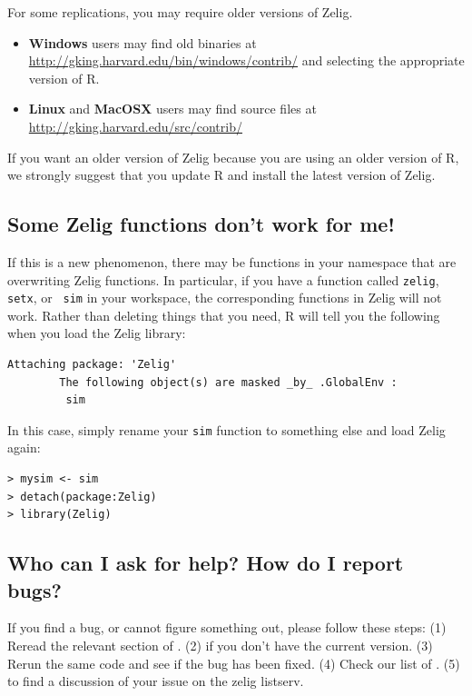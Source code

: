 For some replications, you may require older versions of Zelig. 
\begin{itemize}
\item {\bf Windows} users may find old binaries at
\url{http://gking.harvard.edu/bin/windows/contrib/}
and selecting the appropriate version of R.

\item {\bf Linux} and {\bf MacOSX} users may find source files at
\url{http://gking.harvard.edu/src/contrib/} 
\end{itemize}  
If you want an older version of Zelig because you are using an older
version of R, we strongly suggest that you update R and install the
latest version of Zelig.  

\subsection*{Some Zelig functions don't work for me!}

If this is a new phenomenon, there may be functions in your
namespace that are overwriting Zelig functions.  In particular, if you
have a function called {\tt zelig}, {\tt setx}, or {\tt
sim} in your workspace, the corresponding functions in Zelig will not
work.  Rather than deleting things that you need, R will tell you the
following when you load the Zelig library:
\begin{verbatim}
Attaching package: 'Zelig'
        The following object(s) are masked _by_ .GlobalEnv :
         sim 
\end{verbatim}
In this case, simply rename your {\tt sim} function to something else
and load Zelig again: 
\begin{verbatim}
> mysim <- sim
> detach(package:Zelig)     
> library(Zelig)
\end{verbatim}

\subsection*{Who can I ask for help?  How do I report bugs?}

If you find a bug, or cannot figure something out, please follow these
steps: (1) Reread the relevant section of .  (2)
 if you
don't have the current version.  (3) Rerun the same code and see if
the bug has been fixed.  (4) Check our list
of .
(5)  to find a
discussion of your issue on the zelig listserv.

